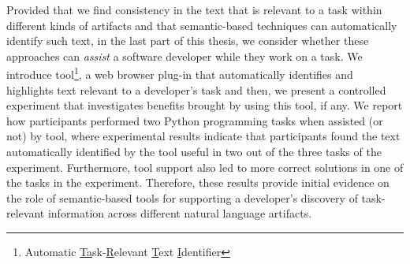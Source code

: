 Provided that we find consistency in the text  that is relevant to a task within different kinds of artifacts and that semantic-based techniques can automatically identify such text, in the last part of this thesis, 
we consider whether these approaches can \textit{assist} a software developer while they work on a task.
We introduce \acs{tool}\footnote{
    Automatic \underline{Ta}sk-\underline{R}elevant \underline{T}ext \underline{I}dentifier
}, a web browser plug-in that 
automatically identifies and highlights text relevant to a developer's task 
and then, we present a controlled experiment that investigates benefits brought by using this tool, if any.
We report how  participants 
performed two Python programming tasks when 
 assisted (or not) by \acs{tool},
where experimental results indicate that participants found the text automatically identified
by the tool 
useful in two out of the three tasks of the experiment.
Furthermore, tool support also led to more correct solutions 
in one of the tasks in the experiment. Therefore, these results provide
initial evidence on the role of semantic-based tools 
for supporting a developer's discovery of task-relevant information
across different natural language artifacts.
















